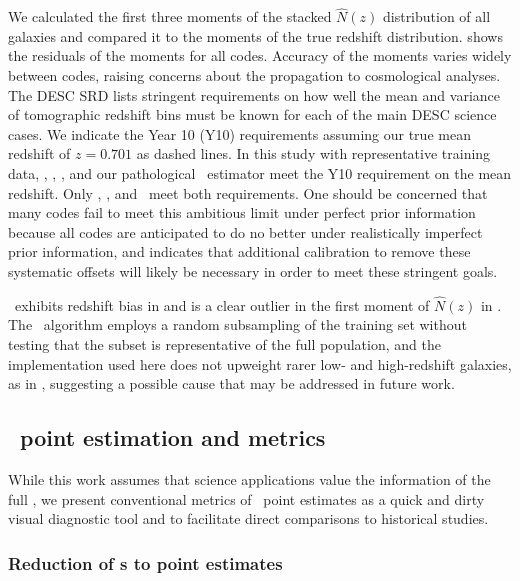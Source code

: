 We calculated the first three moments of the stacked $\hat{N}(z)$ distribution of all galaxies and compared it to the moments of the true redshift distribution.  
 shows the residuals of the moments for all codes.  
Accuracy of the moments varies widely between codes, raising concerns about the propagation to cosmological analyses.  
The DESC SRD \citep{the_lsst_dark_energy_science_collaboration_lsst_2018} lists stringent requirements on how well the mean and variance of tomographic redshift bins must be known for each of the main DESC science cases.  
We indicate the Year 10 (Y10) requirements assuming our true mean redshift of $z=0.701$ as dashed lines.  
In this study with representative training data, \annz, \cmnn, \tpz, and our pathological \trainz\ estimator meet the Y10 requirement on the mean redshift.  Only \annz, \cmnn, and \trainz\ meet both requirements.  
One should be concerned that many codes fail to meet this ambitious limit under perfect prior information because all codes are anticipated to do no better under realistically imperfect prior information, and indicates that additional calibration to remove these systematic offsets \citep[e.~g.~][]{newman_calibrating_2008} will likely be necessary in order to meet these stringent goals.


\skynet\ exhibits redshift bias in  and is a clear outlier in the first moment of $\hat{N}(z)$ in .
The \skynet\ algorithm employs a random subsampling of the training set without testing that the subset is representative of the full population, and the implementation used here does not upweight rarer low- and high-redshift galaxies, as in \citet{bonnett_using_2015}, suggesting a possible cause that may be addressed in future work.

\subsection{\Pz\ point estimation and metrics}
\label{sec:allpointmetrics}

While this work assumes that science applications value the information of the full \pzpdf, we present conventional metrics of \pz\ point estimates as a quick and dirty visual diagnostic tool and to facilitate direct comparisons to historical studies.

\subsubsection{Reduction of \pzpdf s to point estimates}
\label{sec:pointest}

